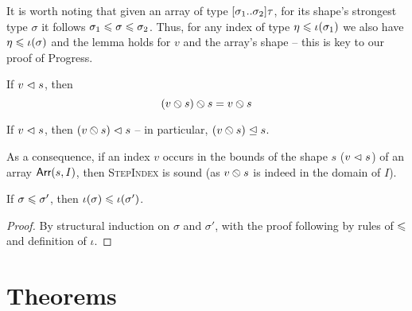 It is worth noting that given an array of type $\sarraytype{\sigma_1}{\sigma_2}{\tau}$, for its shape's strongest type $\sigma$ it follows $\sigma_1 \leqslant \sigma \leqslant \sigma_2$. Thus, for any index of type $\eta \leqslant \iota(\sigma_1)$ we also have $\eta \leqslant \iota(\sigma)$ and the lemma holds for $v$ and the array's shape -- this is key to our proof of Progress.

\begin{lemma}
    If $v \vartriangleleft s$, then $${({v} \obslash {s})} \obslash {s} = {v} \obslash {s}$$
\end{lemma}

\begin{lemma}
    If $v \vartriangleleft s$, then $({v} \obslash {s}) \vartriangleleft s$ -- in particular, $({v} \obslash {s}) \trianglelefteq s$. 
\end{lemma}
As a consequence, if an index $v$ occurs in the bounds of the shape $s$ ($v \vartriangleleft s$) of an array $\textsf{Arr}(s,I)$, then \textsc{StepIndex} is sound (as ${v} \obslash {s}$ is indeed in the domain of $I$).

\begin{lemma}
    If $\sigma \leqslant \sigma'$, then $\iota(\sigma) \leqslant \iota(\sigma')$.
\end{lemma}
\begin{proof}
    By structural induction on $\sigma$ and $\sigma'$, with the proof following by rules of $\leqslant$ and definition of $\iota$.
\end{proof}

\section{Theorems}

